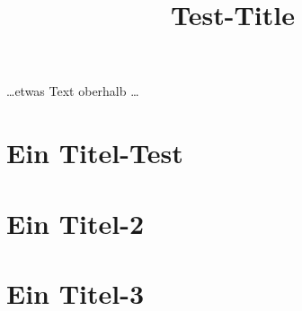 \documentclass[10pt,a4paper]{report}
\title{Test-Title}
\begin{document}
\maketitle
\tableofcontents

\ldots etwas Text oberhalb \ldots
\section{Ein Titel-Test}
\section{Ein Titel-2}
\section{Ein Titel-3}
\end{document}
